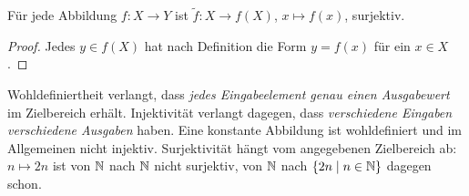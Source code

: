 \begin{satz}
Für jede Abbildung $f:X\to Y$ ist
$\widetilde f:X\to f(X)$, $x\mapsto f(x)$, surjektiv.
\end{satz}
\begin{proof}
Jedes $y\in f(X)$ hat nach Definition die Form $y=f(x)$ für ein $x\in X$.
\end{proof}

\begin{bemerkung}
Wohldefiniertheit verlangt, dass \emph{jedes Eingabeelement genau einen
Ausgabewert} im Zielbereich erhält. Injektivität verlangt dagegen,
dass \emph{verschiedene Eingaben verschiedene Ausgaben} haben.
Eine konstante Abbildung ist wohldefiniert und im Allgemeinen nicht injektiv.
Surjektivität hängt vom angegebenen Zielbereich ab: $n\mapsto2n$
ist von $\mathbb{N}$ nach $\mathbb{N}$ nicht surjektiv, von $\mathbb{N}$ nach
$\{2n\mid n\in\mathbb{N}\}$ dagegen schon.
\end{bemerkung}


